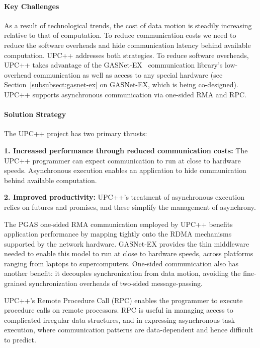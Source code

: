 \paragraph{Key  Challenges}

As a result of technological trends, the cost of data motion is steadily increasing relative to that of computation.  To reduce communication costs we need to 
reduce the software overheads and hide communication latency behind available computation. UPC++ addresses both strategies.
To reduce software overheads, UPC++ takes advantage of the GASNet-EX~\cite{gasnet-lcpc18,gasnet-site}
communication library's 
low-overhead communication as well as access to any special hardware
(see Section~\ref{subsubsect:gasnet-ex} on GASNet-EX, which is being co-designed).
UPC++ supports asynchronous communication via one-sided RMA and RPC.

\paragraph{Solution Strategy}

The UPC++ project has two primary thrusts:


\textbf{1. Increased performance through reduced communication costs:} The
UPC++ programmer can expect communication to run at close to hardware speeds.
Asynchronous execution enables an application to hide communication behind
available computation.

\textbf{2. Improved productivity:}  UPC++'s treatment of asynchronous
execution relies on futures and promises, and these simplify the management of
asynchrony.

The PGAS one-sided RMA communication employed by UPC++
benefits application  performance by mapping tightly onto the RDMA mechanisms
supported by the network hardware. GASNet-EX provides the
thin middleware
needed to enable this model to run at close to hardware speeds, across platforms ranging from laptops to supercomputers.
One-sided communication also has another benefit:
it decouples synchronization from data motion,
avoiding the fine-grained synchronization overheads of two-sided message-passing.

UPC++'s Remote Procedure Call (RPC)
enables the programmer
to execute procedure calls on remote processors.
RPC is useful in managing access to complicated irregular data structures,
and in expressing asynchronous task execution, where communication patterns
are data-dependent and hence difficult to predict.

